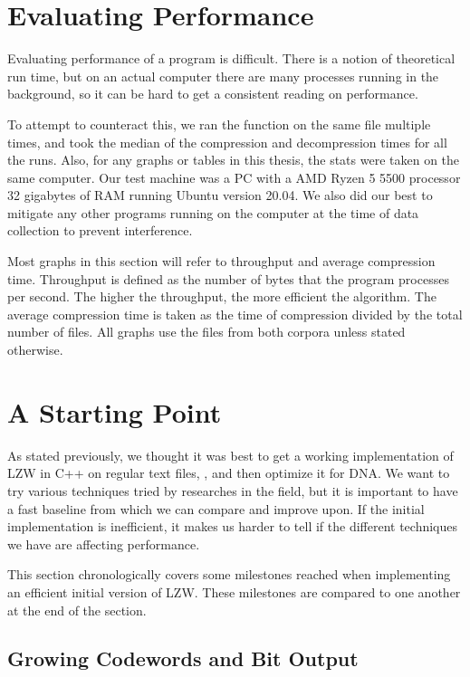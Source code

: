 \documentclass[12pt,twoside]{reedthesis}
\begin{document}
\hypertarget{evaluating-performance}{%
\section{Evaluating Performance}\label{evaluating-performance}}

Evaluating performance of a program is difficult. There is a notion of theoretical run time, but on an actual computer there are many processes running in the background, so it can be hard to get a consistent reading on performance.

To attempt to counteract this, we ran the function on the same file multiple times, and took the median of the compression and decompression times for all the runs. Also, for any graphs or tables in this thesis, the stats were taken on the same computer. Our test machine was a PC with a AMD Ryzen 5 5500 processor 32 gigabytes of RAM running Ubuntu version 20.04. We also did our best to mitigate any other programs running on the computer at the time of data collection to prevent interference.

Most graphs in this section will refer to throughput and average compression time. Throughput is defined as the number of bytes that the program processes per second. The higher the throughput, the more efficient the algorithm. The average compression time is taken as the time of compression divided by the total number of files. All graphs use the files from both corpora unless stated otherwise.

\hypertarget{a-starting-point}{%
\section{A Starting Point}\label{a-starting-point}}

As stated previously, we thought it was best to get a working implementation of LZW in C++ on regular text files, , and then optimize it for DNA. We want to try various techniques tried by researches in the field, but it is important to have a fast baseline from which we can compare and improve upon. If the initial implementation is inefficient, it makes us harder to tell if the different techniques we have are affecting performance.

This section chronologically covers some milestones reached when implementing an efficient initial version of LZW. These milestones are compared to one another at the end of the section.

\hypertarget{growing-codewords-and-bit-output}{%
\subsection{Growing Codewords and Bit Output}\label{growing-codewords-and-bit-output}}
\end{document}
